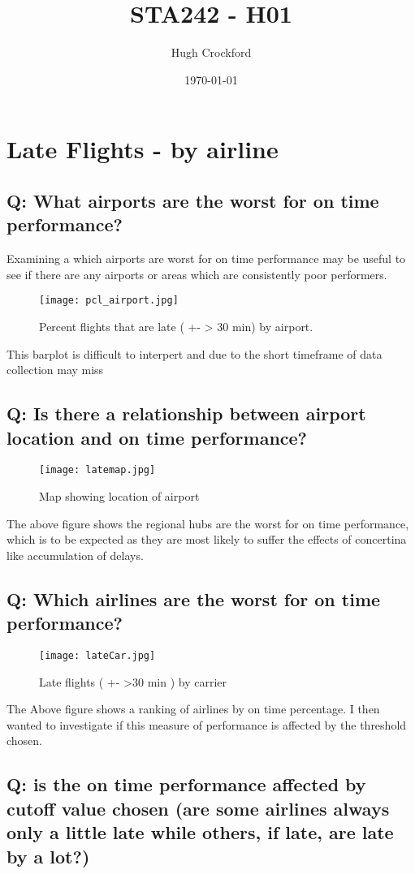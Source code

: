 \documentclass[12pt]{article}
\title{STA242 - H01}
\author{Hugh Crockford}
\date{\today}
\begin{document}
	\maketitle
	\tableofcontents
	\clearpage
	\section{Late Flights - by airline }
	\subsection{Q: What airports are the worst for on time performance?}
		Examining a which airports are worst for on time performance may be useful to see if there are any airports or areas which are consistently poor performers.
		\begin{figure}[h!b]
			\centering
			\texttt{[image: pcl\_airport.jpg]}
			\caption{Percent flights that are late ( +- > 30 min) by airport. }
		\end{figure}
		This barplot is difficult to interpert and due to the short timeframe of data collection may miss 
	\newpage
	\subsection{Q: Is there a relationship between airport location and on time performance?}
		\begin{figure}[h!]
			\centering
			\texttt{[image: latemap.jpg]}
			\caption{Map showing location of airport}
		\end{figure}
		The above figure shows the regional hubs are the worst for on time performance, which is to be expected as they are most likely to suffer the effects of concertina like accumulation of delays.
	\newpage
	\subsection{Q: Which airlines are the worst for on time performance?}
	\begin{figure}[h!]
		\centering
		\texttt{[image: lateCar.jpg]}
		\caption{Late flights ( +- >30 min ) by carrier}
	\end{figure}
	The Above figure shows a ranking of airlines by on time percentage.
	I then wanted to investigate if this measure of performance is affected by the threshold chosen.
	\newpage
	\subsection{Q: is the on time performance affected by cutoff value chosen (are some airlines always only a little late while others, if late, are late by a lot?)}
	\newpage
\end{document}
